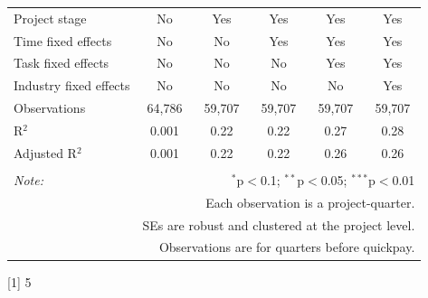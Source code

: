 \documentclass[
]{article}
\begin{document}
\begin{table}[H]
\begin{tabular}{@{\extracolsep{-2pt}}lccccc}
Project stage & No & Yes & Yes & Yes & Yes \\ 
Time fixed effects & No & No & Yes & Yes & Yes \\ 
Task fixed effects & No & No & No & Yes & Yes \\ 
Industry fixed effects & No & No & No & No & Yes \\ 
Observations & 64,786 & 59,707 & 59,707 & 59,707 & 59,707 \\ 
R$^{2}$ & 0.001 & 0.22 & 0.22 & 0.27 & 0.28 \\ 
Adjusted R$^{2}$ & 0.001 & 0.22 & 0.22 & 0.26 & 0.26 \\ 
\hline 
\hline \\[-1.8ex] 
\textit{Note:}  & \multicolumn{5}{r}{$^{*}$p$<$0.1; $^{**}$p$<$0.05; $^{***}$p$<$0.01} \\ 
 & \multicolumn{5}{r}{Each observation is a project-quarter.} \\ 
 & \multicolumn{5}{r}{SEs are robust and clustered at the project level.} \\ 
 & \multicolumn{5}{r}{Observations are for quarters before quickpay.} \\ 
\end{tabular} 
\end{table}

{[}1{]} 5
\end{document}
